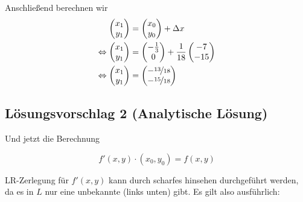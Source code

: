 Anschließend berechnen wir
\begin{align}
	\begin{pmatrix}
		x_1\\
		y_1
	\end{pmatrix} &= 
	\begin{pmatrix}
		x_0\\
		y_0
	\end{pmatrix}+\Delta x \\
	\Leftrightarrow\begin{pmatrix}
		x_1\\
		y_1
	\end{pmatrix} &= 
	\begin{pmatrix}
		-\frac{1}{3}\\
		0
	\end{pmatrix} +
    \frac{1}{18}
	\begin{pmatrix}
		-7\\
		-15
	\end{pmatrix} \\
	\Leftrightarrow\begin{pmatrix}
		x_1\\
		y_1
	\end{pmatrix} &= 
	\begin{pmatrix}
		-\nicefrac{13}{18}\\
		-\nicefrac{15}{18}
	\end{pmatrix}
\end{align}


\subsection*{Lösungsvorschlag 2 (Analytische Lösung)}
Und jetzt die Berechnung %

\[f'(x, y) \cdot (x_0, y_0) = f(x,y)\] %

LR-Zerlegung für $f'(x, y)$ kann durch scharfes hinsehen durchgeführt
werden, da es in $L$ nur eine unbekannte (links unten) gibt. Es gilt
also ausführlich:

